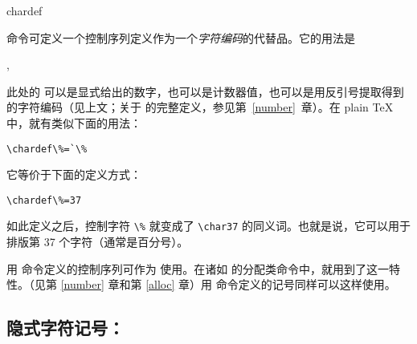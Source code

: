\documentclass{book}
\begin{document}
\csterm chardef\par 命令可定义一个控制序列定义作为一个\emph{字符编码}的代替品。\label{chardef}它的用法是
\begin{disp}
,
\end{disp}
此处的  可以是显式给出的数字，也可以是计数器值，也可以是用反引号提取得到的字符编码（见上文；关于  的完整定义，参见第~\ref{number}~章）。在 plain TeX 中，就有类似下面的用法：
\begin{verbatim}
\chardef\%=`\%
\end{verbatim}
它等价于下面的定义方式：
\begin{verbatim}
\chardef\%=37
\end{verbatim}
如此定义之后，控制字符 \verb.\%. 就变成了 \verb.\char37. 的同义词。也就是说，它可以用于排版第 37 个字符（通常是百分号）。

用  命令定义的控制序列可作为  使用。在诸如  的分配类命令中，就用到了这一特性。（见第 \ref{number} 章和第 \ref{alloc} 章）用  命令定义的记号同样可以这样使用。

\subsection{隐式字符记号：\protect{}}
\end{document}
